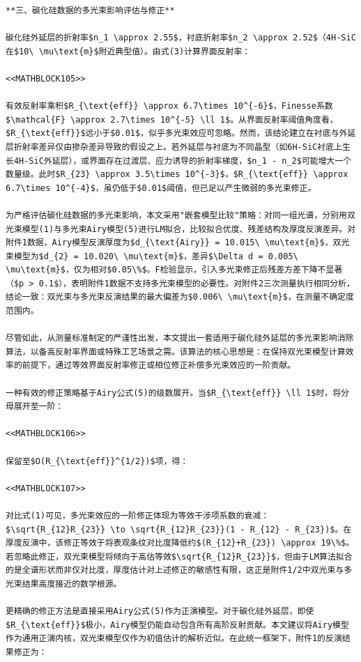 \documentclass{mcmthesis}
\begin{document}
\begin{table}[htbp]
\begin{lstlisting}
**三、碳化硅数据的多光束影响评估与修正**

碳化硅外延层的折射率$n_1 \approx 2.55$，衬底折射率$n_2 \approx 2.52$（4H-SiC在$10\ \mu\text{m}$附近典型值）。由式(3)计算界面反射率：

<<MATHBLOCK105>>

有效反射率乘积$R_{\text{eff}} \approx 6.7\times 10^{-6}$，Finesse系数$\mathcal{F} \approx 2.7\times 10^{-5} \ll 1$。从界面反射率阈值角度看，$R_{\text{eff}}$远小于$0.01$，似乎多光束效应可忽略。然而，该结论建立在衬底与外延层折射率差异仅由掺杂差异导致的假设之上。若外延层与衬底为不同晶型（如6H-SiC衬底上生长4H-SiC外延层），或界面存在过渡层、应力诱导的折射率梯度，$n_1 - n_2$可能增大一个数量级。此时$R_{23} \approx 3.5\times 10^{-3}$，$R_{\text{eff}} \approx 6.7\times 10^{-4}$，虽仍低于$0.01$阈值，但已足以产生微弱的多光束修正。

为严格评估碳化硅数据的多光束影响，本文采用"嵌套模型比较"策略：对同一组光谱，分别用双光束模型(1)与多光束Airy模型(5)进行LM拟合，比较拟合优度、残差结构及厚度反演差异。对附件1数据，Airy模型反演厚度为$d_{\text{Airy}} = 10.015\ \mu\text{m}$，双光束模型为$d_{2} = 10.020\ \mu\text{m}$，差异$\Delta d = 0.005\ \mu\text{m}$，仅为相对$0.05\%$。F检验显示，引入多光束修正后残差方差下降不显著（$p > 0.1$），表明附件1数据不支持多光束模型的必要性。对附件2三次测量执行相同分析，结论一致：双光束与多光束反演结果的最大偏差为$0.006\ \mu\text{m}$，在测量不确定度范围内。

尽管如此，从测量标准制定的严谨性出发，本文提出一套适用于碳化硅外延层的多光束影响消除算法，以备高反射率界面或特殊工艺场景之需。该算法的核心思想是：在保持双光束模型计算效率的前提下，通过等效界面反射率修正或相位修正补偿多光束效应的一阶贡献。

一种有效的修正策略基于Airy公式(5)的级数展开。当$R_{\text{eff}} \ll 1$时，将分母展开至一阶：

<<MATHBLOCK106>>

保留至$O(R_{\text{eff}}^{1/2})$项，得：

<<MATHBLOCK107>>

对比式(1)可见，多光束效应的一阶修正体现为等效干涉项系数的衰减：$\sqrt{R_{12}R_{23}} \to \sqrt{R_{12}R_{23}}(1 - R_{12} - R_{23})$。在厚度反演中，该修正等效于将表观条纹对比度降低约$(R_{12}+R_{23}) \approx 19\%$。若忽略此修正，双光束模型将倾向于高估等效$\sqrt{R_{12}R_{23}}$，但由于LM算法拟合的是全谱形状而非仅对比度，厚度估计对上述修正的敏感性有限，这正是附件1/2中双光束与多光束结果高度接近的数学根源。

更精确的修正方法是直接采用Airy公式(5)作为正演模型。对于碳化硅外延层，即使$R_{\text{eff}}$极小，Airy模型仍能自动包含所有高阶反射贡献。本文建议将Airy模型作为通用正演内核，双光束模型仅作为初值估计的解析近似。在此统一框架下，附件1的反演结果修正为：


\end{lstlisting}
\end{table}
\end{document}
